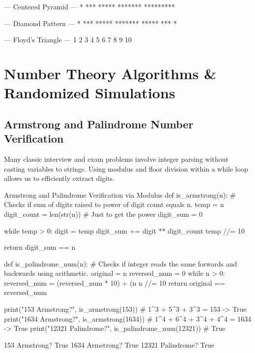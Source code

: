 \begin{outputbox}
--- Centered Pyramid ---
    *
   ***
  *****
 *******
*********

--- Diamond Pattern ---
   *
  ***
 *****
*******
 *****
  ***
   *

--- Floyd's Triangle ---
  1 
  2  3 
  4  5  6 
  7  8  9 10 
\end{outputbox}

\section{Number Theory Algorithms \& Randomized Simulations}

\subsection{Armstrong and Palindrome Number Verification}

Many classic interview and exam problems involve integer parsing without casting variables to strings. Using modulus and floor division within a while loop allows us to efficiently extract digits.

\begin{pythoncode}{Armstrong and Palindrome Verification via Modulus}
def is_armstrong(n):
    # Checks if sum of digits raised to power of digit count equals n.
    temp = n
    digit_count = len(str(n))  # Just to get the power
    digit_sum = 0
    
    while temp > 0:
        digit = temp %
        digit_sum += digit ** digit_count
        temp //= 10
        
    return digit_sum == n

def is_palindrome_num(n):
    # Checks if integer reads the same forwards and backwards using arithmetic.
    original = n
    reversed_num = 0
    while n > 0:
        reversed_num = (reversed_num * 10) + (n %
        n //= 10
    return original == reversed_num

print("153 Armstrong?", is_armstrong(153))    # 1^3 + 5^3 + 3^3 = 153 -> True
print("1634 Armstrong?", is_armstrong(1634))  # 1^4 + 6^4 + 3^4 + 4^4 = 1634 -> True
print("12321 Palindrome?", is_palindrome_num(12321)) # True
\end{pythoncode}
\begin{outputbox}
153 Armstrong? True
1634 Armstrong? True
12321 Palindrome? True
\end{outputbox}

